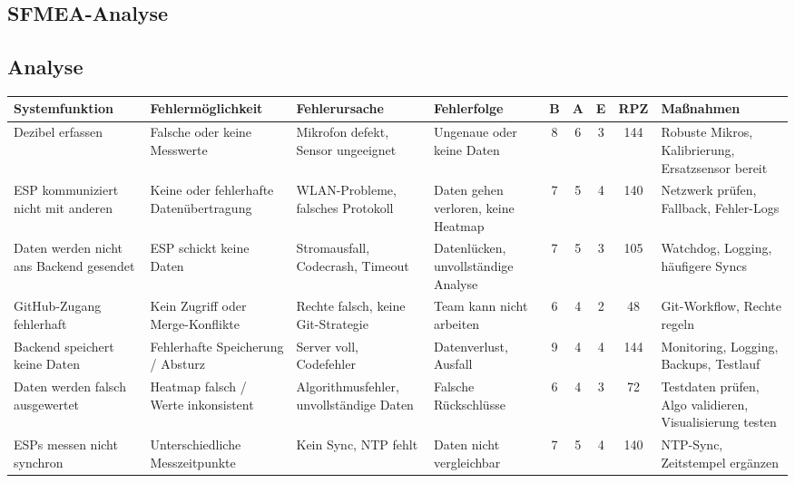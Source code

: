 \begin{landscape}
\chapter{SFMEA-Analyse}
\section{Analyse}
\label{cha:sfmea}
\small
\begin{longtable}{|p{3.4cm}|p{3.4cm}|p{3.4cm}|p{3.4cm}|c|c|c|c|p{3.4cm}|}

    \hline
    \textbf{Systemfunktion} & \textbf{Fehlermöglichkeit} & \textbf{Fehlerursache} & \textbf{Fehlerfolge} & \textbf{B} & \textbf{A} & \textbf{E} & \textbf{RPZ} & \textbf{Maßnahmen} \\
    \hline
    \endhead

    Dezibel erfassen & Falsche oder keine Messwerte & Mikrofon defekt, Sensor ungeeignet & Ungenaue oder keine Daten & 8 & 6 & 3 & 144 & Robuste Mikros, Kalibrierung, Ersatzsensor bereit \\
    \hline
    ESP kommuniziert nicht mit anderen & Keine oder fehlerhafte Datenübertragung & WLAN-Probleme, falsches Protokoll & Daten gehen verloren, keine Heatmap & 7 & 5 & 4 & 140 & Netzwerk prüfen, Fallback, Fehler-Logs \\
    \hline
    Daten werden nicht ans Backend gesendet & ESP schickt keine Daten & Stromausfall, Codecrash, Timeout & Datenlücken, unvollständige Analyse & 7 & 5 & 3 & 105 & Watchdog, Logging, häufigere Syncs \\
    \hline
    GitHub-Zugang fehlerhaft & Kein Zugriff oder Merge-Konflikte & Rechte falsch, keine Git-Strategie & Team kann nicht arbeiten & 6 & 4 & 2 & 48 & Git-Workflow, Rechte regeln \\
    \hline
    Backend speichert keine Daten & Fehlerhafte Speicherung / Absturz & Server voll, Codefehler & Datenverlust, Ausfall & 9 & 4 & 4 & 144 & Monitoring, Logging, Backups, Testlauf \\
    \hline
    Daten werden falsch ausgewertet & Heatmap falsch / Werte inkonsistent & Algorithmusfehler, unvollständige Daten & Falsche Rückschlüsse & 6 & 4 & 3 & 72 & Testdaten prüfen, Algo validieren, Visualisierung testen \\
    \hline
    ESPs messen nicht synchron & Unterschiedliche Messzeitpunkte & Kein Sync, NTP fehlt & Daten nicht vergleichbar & 7 & 5 & 4 & 140 & NTP-Sync, Zeitstempel ergänzen \\
    \hline

\end{longtable}
\end{landscape}

